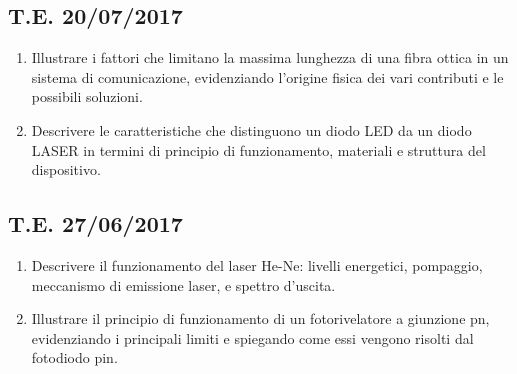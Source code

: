 \documentclass[9pt]{extarticle}
\begin{document}
\subsection{T.E. 20/07/2017}
\begin{enumerate}
  \item Illustrare i fattori che limitano la massima lunghezza di una fibra ottica in un sistema di comunicazione,
        evidenziando l’origine fisica dei vari contributi e le possibili soluzioni.
  \item Descrivere le caratteristiche che distinguono un diodo LED da un diodo LASER in termini di principio di
        funzionamento, materiali e struttura del dispositivo.
\end{enumerate}

\subsection{T.E. 27/06/2017}
\begin{enumerate}
  \item Descrivere il funzionamento del laser He-Ne: livelli energetici, pompaggio, meccanismo di emissione laser, e
        spettro d’uscita.
  \item Illustrare il principio di funzionamento di un fotorivelatore a giunzione pn, evidenziando i principali limiti e
        spiegando come essi vengono risolti dal fotodiodo pin.
\end{enumerate}

\iffalse
  \subsection{}
  \begin{enumerate}
    \item
    \item
  \end{enumerate}
\fi
\end{document}
